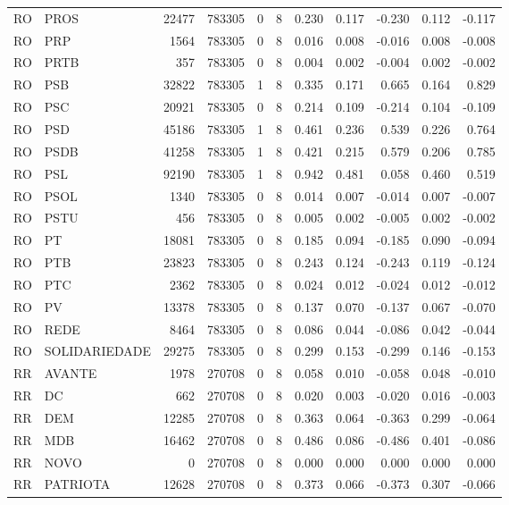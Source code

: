 \begin{landscape}
\begin{longtable}{llrrrrrrrrr}
RO & PROS & 22477 & 783305 & 0 & 8 & 0.230 & 0.117 & -0.230 & 0.112 & -0.117 \\
RO & PRP & 1564 & 783305 & 0 & 8 & 0.016 & 0.008 & -0.016 & 0.008 & -0.008 \\
RO & PRTB & 357 & 783305 & 0 & 8 & 0.004 & 0.002 & -0.004 & 0.002 & -0.002 \\
RO & PSB & 32822 & 783305 & 1 & 8 & 0.335 & 0.171 & 0.665 & 0.164 & 0.829 \\
RO & PSC & 20921 & 783305 & 0 & 8 & 0.214 & 0.109 & -0.214 & 0.104 & -0.109 \\
RO & PSD & 45186 & 783305 & 1 & 8 & 0.461 & 0.236 & 0.539 & 0.226 & 0.764 \\
RO & PSDB & 41258 & 783305 & 1 & 8 & 0.421 & 0.215 & 0.579 & 0.206 & 0.785 \\
RO & PSL & 92190 & 783305 & 1 & 8 & 0.942 & 0.481 & 0.058 & 0.460 & 0.519 \\
RO & PSOL & 1340 & 783305 & 0 & 8 & 0.014 & 0.007 & -0.014 & 0.007 & -0.007 \\
RO & PSTU & 456 & 783305 & 0 & 8 & 0.005 & 0.002 & -0.005 & 0.002 & -0.002 \\
RO & PT & 18081 & 783305 & 0 & 8 & 0.185 & 0.094 & -0.185 & 0.090 & -0.094 \\
RO & PTB & 23823 & 783305 & 0 & 8 & 0.243 & 0.124 & -0.243 & 0.119 & -0.124 \\
RO & PTC & 2362 & 783305 & 0 & 8 & 0.024 & 0.012 & -0.024 & 0.012 & -0.012 \\
RO & PV & 13378 & 783305 & 0 & 8 & 0.137 & 0.070 & -0.137 & 0.067 & -0.070 \\
RO & REDE & 8464 & 783305 & 0 & 8 & 0.086 & 0.044 & -0.086 & 0.042 & -0.044 \\
RO & SOLIDARIEDADE & 29275 & 783305 & 0 & 8 & 0.299 & 0.153 & -0.299 & 0.146 & -0.153 \\
RR & AVANTE & 1978 & 270708 & 0 & 8 & 0.058 & 0.010 & -0.058 & 0.048 & -0.010 \\
RR & DC & 662 & 270708 & 0 & 8 & 0.020 & 0.003 & -0.020 & 0.016 & -0.003 \\
RR & DEM & 12285 & 270708 & 0 & 8 & 0.363 & 0.064 & -0.363 & 0.299 & -0.064 \\
RR & MDB & 16462 & 270708 & 0 & 8 & 0.486 & 0.086 & -0.486 & 0.401 & -0.086 \\
RR & NOVO & 0 & 270708 & 0 & 8 & 0.000 & 0.000 & 0.000 & 0.000 & 0.000 \\
RR & PATRIOTA & 12628 & 270708 & 0 & 8 & 0.373 & 0.066 & -0.373 & 0.307 & -0.066 \\

\end{longtable}
\end{landscape}
